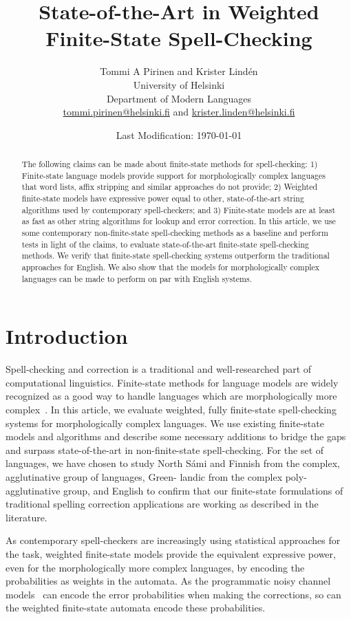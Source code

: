 \documentclass[postprint]{flammie}
\title{State-of-the-Art in Weighted Finite-State Spell-Checking}
\author{Tommi A Pirinen and Krister Lindén\\
University of Helsinki\\
Department of Modern Languages\\
\url{tommi.pirinen@helsinki.fi} and \url{krister.linden@helsinki.fi}}
\date{Last Modification: \today}
\begin{document}
\maketitle

\begin{abstract}
The following claims can be made about finite-state methods for spell-checking:
1) Finite-state language models provide support for morphologically complex
languages that word lists, affix stripping and similar approaches do not
provide; 2) Weighted finite-state models have expressive power equal to other,
state-of-the-art string algorithms used by contemporary spell-checkers; and 3)
Finite-state models are at least as fast as other string algorithms for lookup
and error correction. In this article, we use some contemporary
non-finite-state spell-checking methods as a baseline and perform tests in
light of the claims, to evaluate state-of-the-art finite-state spell-checking
methods. We verify that finite-state spell-checking systems outperform the
traditional approaches for English. We also show that the models for
morphologically complex languages can be made to perform on par with English
systems.

\end{abstract}

\section{Introduction}

Spell-checking and correction is a traditional and well-researched part of
computational linguistics. Finite-state methods for language models are
widely recognized as a good way to handle languages which are morphologically
more complex~\cite{beesley2003finite}. In this article, we evaluate weighted, fully finite-state
spell-checking systems for morphologically complex languages. We use existing
finite-state models and algorithms and describe some necessary additions to
bridge the gaps and surpass state-of-the-art in non-finite-state
spell-checking. For the set of languages, we have chosen to study North Sámi
and Finnish from the complex, agglutinative group of languages, Green- landic
from the complex poly-agglutinative group, and English to confirm that our
finite-state formulations of traditional spelling correction applications are
working as described in the literature.

As contemporary spell-checkers are increasingly using statistical approaches
for the task, weighted finite-state models provide the equivalent expressive
power, even for the morphologically more complex languages, by encoding the
probabilities as weights in the automata. As the programmatic noisy channel
models~\cite{brill2000improved} can encode the error probabilities when making
the corrections, so can the weighted finite-state automata encode these
probabilities.
\end{document}
